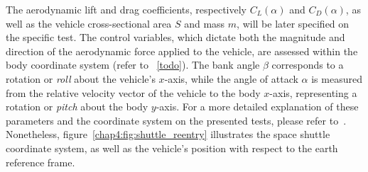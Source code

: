%
The aerodynamic lift and drag coefficients, respectively $C_L(\alpha)$ and $C_D(\alpha)$, as well as the vehicle cross-sectional area $S$ and mass $m$, will be later specified on the specific test. The control variables, which dictate both the magnitude and direction of the aerodynamic force applied to the vehicle, are assessed within the body coordinate system (refer to \figurename~\ref{todo}). The bank angle $\beta$ corresponds to a rotation or \emph{roll} about the vehicle's $x$-axis, while the angle of attack $\alpha$ is measured from the relative velocity vector of the vehicle to the body $x$-axis, representing a rotation or \emph{pitch} about the body $y$-axis. For a more detailed explanation of these parameters and the coordinate system on the presented tests, please refer to~\cite{brenan1983stability}. Nonetheless, figure~\ref{chap4:fig:shuttle_reentry} illustrates the space shuttle coordinate system, as well as the vehicle's position with respect to the earth reference frame.

